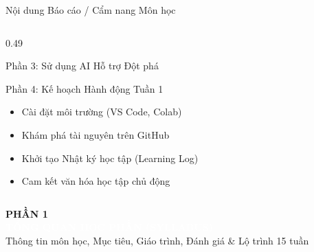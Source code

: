 \documentclass[aspectratio=169, 10pt]{beamer}
\begin{document}
\begin{frame}{Nội dung Báo cáo / Cẩm nang Môn học}
\begin{columns}[T]
\begin{column}{0.49\textwidth}
\begin{cbox}[accentorange]{Phần 3: Sử dụng AI Hỗ trợ Đột phá}
\begin{itemize}
        \end{itemize}
      \end{cbox}
      \vspace{0.1cm}
      \begin{cbox}[darkgray]{Phần 4: Kế hoạch Hành động Tuần 1}
        \footnotesize
        \begin{itemize}\setlength{\itemsep}{1pt}
          \item Cài đặt môi trường (VS Code, Colab)
          \item Khám phá tài nguyên trên GitHub
          \item Khởi tạo Nhật ký học tập (Learning Log)
          \item Cam kết văn hóa học tập chủ động
        \end{itemize}
      \end{cbox}
    \end{column}
  \end{columns}
\end{frame}

\begin{frame}[plain]
  \vfill
  \begin{tcolorbox}[colback=primaryblue, colframe=primaryblue, arc=5pt, left=15pt, right=15pt, top=15pt, bottom=15pt]
    \textcolor{accentorange}{\large\textbf{PHẦN 1}}\\[4pt]
    {\LARGE\textbf{\textcolor{white}{TỔNG QUAN HỌC PHẦN (SYLLABUS)}}}\\[6pt]
    \textcolor{white!80}{\small Thông tin môn học, Mục tiêu, Giáo trình, Đánh giá \& Lộ trình 15 tuần}
  \end{tcolorbox}
  \vfill
\end{frame}
\end{document}
